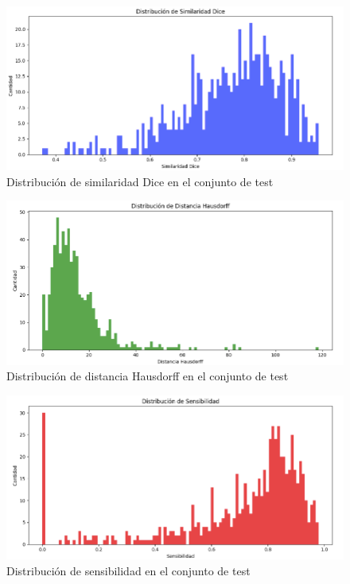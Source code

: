 \begin{figure}[H]
	\centering
	\includegraphics[width=0.75\linewidth]{imagenes/dist_dice_test.png}
	\caption{Distribución de similaridad Dice en el conjunto de test}
\end{figure}

\begin{figure}[H]
	\centering
	\includegraphics[width=0.75\linewidth]{imagenes/dist_haus_test.png}
	\caption{Distribución de distancia Hausdorff en el conjunto de test}
\end{figure}

\begin{figure}[H]
	\centering
	\includegraphics[width=0.75\linewidth]{imagenes/dist_sen_test.png}
	\caption{Distribución de sensibilidad en el conjunto de test}
\end{figure}